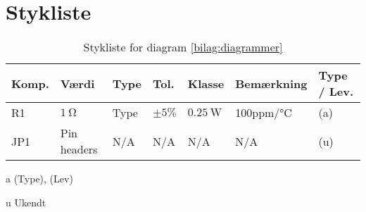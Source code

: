\chapter{Stykliste} \label{bilag:styklister}

\begin{table}[h!]
\small
\caption{Stykliste for diagram \ref{bilag:diagrammer}}
\label{tab:styklister}
\begin{threeparttable}
\begin{tabular}{ l l l l l l l }
\toprule
\multicolumn{1}{l}{\textbf{Komp.}}       &
\multicolumn{1}{l}{\textbf{Værdi}}       &
\multicolumn{1}{l}{\textbf{Type}}       &
\multicolumn{1}{l}{\textbf{Tol.}} &
\multicolumn{1}{l}{\textbf{Klasse}} &
\multicolumn{1}{l}{\textbf{Bemærkning}} &
\multicolumn{1}{l}{\textbf{Type / Lev.}}  \\ 
\hline
R1 & $\SI{1}{\ohm}$			& Type	& $\pm 5\%$ 		 & $\SI{0.25}{\watt}$	  & 100ppm/\si{\celsius}  & (a) \\
JP1 & Pin headers & N/A & N/A & N/A & N/A & (u) \\

\hline
\bottomrule
\end{tabular}
\begin{tablenotes}
\item[a] (Type), (Lev)
\item[u] Ukendt
\end{tablenotes}
\end{threeparttable}
\end{table} 
